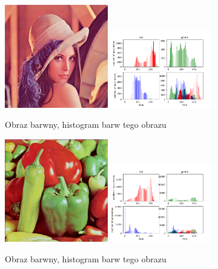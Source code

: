 \documentclass[final,a4paper,openany,12pt]{mwbk}
\begin{document}
\begin{figure}[H]
	\begin{center}
		\includegraphics[width=0.4\textwidth]{lena_color}
		\includegraphics[width=0.4\textwidth]{lena_color_histogram}
	\end{center}
	\caption{Obraz barwny, histogram barw tego obrazu}
\end{figure}

\begin{figure}[H]
	\begin{center}
		\includegraphics[width=0.4\textwidth]{peppers_color}
		\includegraphics[width=0.4\textwidth]{peppers_color_histogram}
	\end{center}
	\caption{Obraz barwny, histogram barw tego obrazu}
\end{figure}
\pagebreak
\end{document}
